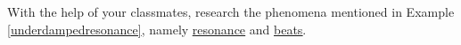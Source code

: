 { With the help of your classmates, research the phenomena mentioned in Example \ref{underdampedresonance}, namely \href{http://en.wikipedia.org/wiki/Resonance}{\underline{resonance}} and \href{http://en.wikipedia.org/wiki/Beat_(acoustics)}{\underline{beats}}.}
{}
